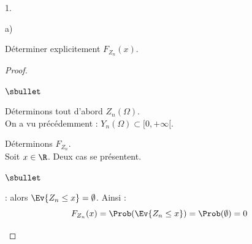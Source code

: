 \begin{noliste}{1.}
\begin{noliste}{a)}
  \item Déterminer explicitement $F_{Z_{n}}(x)$.
  
  \begin{proof}~%
    \begin{noliste}{$\sbullet$}
    \item Déterminons tout d'abord $Z_n(\Omega)$.\\
      On a vu précédemment : $Y_n(\Omega) \subset [0, +\infty[$.%
      \conc{Comme $Z_n = Y_n - \ln(n)$, on en déduit que $Z_n(\Omega)
        \subset [-\ln(n), +\infty[$}~
    \end{noliste}
    Déterminons $F_{Z_n}$.\\
    Soit $x\in\R$. Deux cas se présentent.
    \begin{noliste}{$\sbullet$}
    \item {} : alors $\Ev{Z_n \leq x} =
      \emptyset$. Ainsi :
      \[
      F_{Z_n}(x) = \Prob(\Ev{Z_n \leq x}) = \Prob(\emptyset) = 0
      \]
      

\end{noliste}
\end{proof}
\end{noliste}
\end{noliste}
